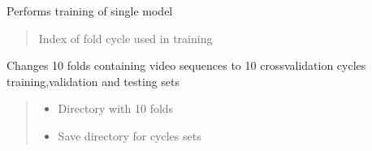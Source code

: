 \documentclass[letterpaper,10pt,english]{sphinxmanual}
\begin{document}
\begin{fulllineitems}
\begin{fulllineitems}
\begin{quote}
\begin{description}
\begin{itemize}
\end{itemize}

\end{description}\end{quote}

\end{fulllineitems}


\begin{fulllineitems}
\label{\detokenize{net:net.UVANEMO.single_train}}
\pysigstartsignatures
{}
\pysigstopsignatures
\sphinxAtStartPar
Performs training of single model
\begin{quote}\begin{description}
\sphinxAtStartPar
{} \textendash{} Index of fold cycle used in training

\end{description}\end{quote}

\end{fulllineitems}


\begin{fulllineitems}
\label{\detokenize{net:net.UVANEMO.split}}
\pysigstartsignatures
{}
\pysigstopsignatures
\sphinxAtStartPar
Changes 10 folds containing video sequences to 10 cross\sphinxhyphen{}validation cycles training,validation and testing sets
\begin{quote}\begin{description}
\begin{itemize}
\item {} 
\sphinxAtStartPar
{} \textendash{} Directory with 10 folds

\item {} 
\sphinxAtStartPar
{} \textendash{} Save directory for cycles sets

\end{itemize}


\end{description}
\end{quote}
\end{fulllineitems}
\end{fulllineitems}
\end{document}
